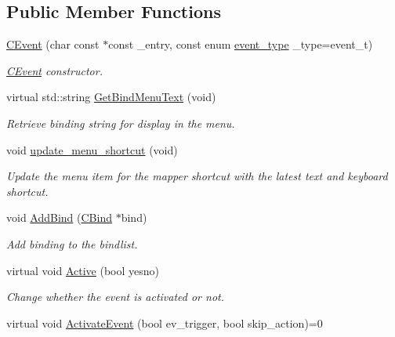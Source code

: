 \subsection*{Public Member Functions}
\begin{DoxyCompactItemize}
\item 
\hyperlink{classCEvent_a1dccd12980b4a85ca70ca6d77d631b45}{C\-Event} (char const $\ast$const \-\_\-entry, const enum \hyperlink{classCEvent_a93a65775636793dfcabe38d14739c2bd}{event\-\_\-type} \-\_\-type=event\-\_\-t)
\begin{DoxyCompactList}\small\item\em \hyperlink{classCEvent}{C\-Event} constructor. \end{DoxyCompactList}\item 
virtual std\-::string \hyperlink{classCEvent_adcc4bad114bb2f135e354d018cbe1d8c}{Get\-Bind\-Menu\-Text} (void)
\begin{DoxyCompactList}\small\item\em Retrieve binding string for display in the menu. \end{DoxyCompactList}\item 
\hypertarget{classCEvent_a0ebaf9dbda3dc862fb61e21280dd987f}{void \hyperlink{classCEvent_a0ebaf9dbda3dc862fb61e21280dd987f}{update\-\_\-menu\-\_\-shortcut} (void)}\label{classCEvent_a0ebaf9dbda3dc862fb61e21280dd987f}

\begin{DoxyCompactList}\small\item\em Update the menu item for the mapper shortcut with the latest text and keyboard shortcut. \end{DoxyCompactList}\item 
\hypertarget{classCEvent_a2665ebd0551c2b437b02d521f1c7adda}{void \hyperlink{classCEvent_a2665ebd0551c2b437b02d521f1c7adda}{Add\-Bind} (\hyperlink{classCBind}{C\-Bind} $\ast$bind)}\label{classCEvent_a2665ebd0551c2b437b02d521f1c7adda}

\begin{DoxyCompactList}\small\item\em Add binding to the bindlist. \end{DoxyCompactList}\item 
\hypertarget{classCEvent_a8643a8541e23ed77a63869dd11780c83}{virtual void \hyperlink{classCEvent_a8643a8541e23ed77a63869dd11780c83}{Active} (bool yesno)}\label{classCEvent_a8643a8541e23ed77a63869dd11780c83}

\begin{DoxyCompactList}\small\item\em Change whether the event is activated or not. \end{DoxyCompactList}\item 
\hypertarget{classCEvent_a1b7abcd9c0ecedc29de42017e3cfef13}{virtual void \hyperlink{classCEvent_a1b7abcd9c0ecedc29de42017e3cfef13}{Activate\-Event} (bool ev\-\_\-trigger, bool skip\-\_\-action)=0}\label{classCEvent_a1b7abcd9c0ecedc29de42017e3cfef13}


\end{DoxyCompactItemize}
